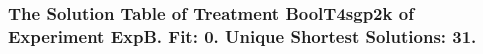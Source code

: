  \begin{frame}
 \fontsize{8pt}{9pt}\selectfont
 \frametitle{ The Solution Table of Treatment BoolT4sgp2k of Experiment ExpB. Fit: 0. Unique Shortest Solutions: 31. }

 \label{ExpBSolutionTable020.tex}  
 \end{frame}

